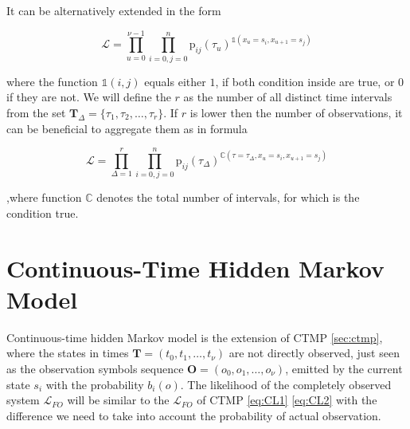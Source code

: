 \documentclass[thesis=M,english]{FITthesis}[2012/10/20]
\newcommand{\matr}[1]{\mathbf{#1}}
\begin{document}
It can be alternatively extended in the form

\begin{equation}
 \mathcal{L} = \prod_{u=0}^{\nu-1} \prod_{i=0,j=0}^{n}  \mathrm{p}_{ij}(\tau_u)^{\mathds{1}( x_u = s_i, x_{u+1} = s_j )} 
\end{equation}

where the function $\mathds{1}(i,j)$ equals either $1$, if both condition inside are true, or $0$ if they are not. 
We will define the $r$ as the number of all distinct time intervals from the set $ \matr{T}_{\Delta} = \{ \tau_1,\tau_2,\dots,\tau_r\}$. If $r$ is lower then the number of observations, it can be beneficial to aggregate them as in formula

\begin{equation}\label{eq:CTL}
 \mathcal{L} = \prod_{\Delta = 1}^{r} \prod_{i=0,j=0}^{n}  \mathrm{p}_{ij}(\tau_{\Delta})^{\mathbb{C}( \tau=\tau_{\Delta}, x_u = s_i, x_{u+1} = s_j )} 
\end{equation}

,where function $\mathbb{C}$ denotes the total number of intervals, for which is the condition true.
    

\section{Continuous-Time Hidden Markov Model}\label{sec:cthmm1}



Continuous-time hidden Markov model is the extension of CTMP \ref{sec:ctmp}, where the states in times $\matr{T} = ( t_0, t_1, \dots, t_{\nu} )$ are not directly observed, just seen as the observation symbols sequence $\matr{O} = (  o_0, o_1, \dots, o_{\nu} )$, emitted by the current state $s_i$ with the probability $b_i(o)$.
The likelihood of the completely observed system  $\mathcal{L}_{FO}$ will be similar to the $\mathcal{L}_{FO}$ of CTMP \eqref{eq:CL1} \eqref{eq:CL2} with the difference we need to take into account the probability of actual observation.
\end{document}
